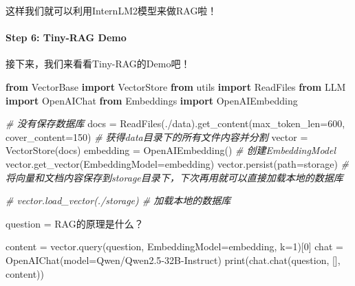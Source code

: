 \documentclass[
]{article}
\newenvironment{Shaded}{}{}
\newcommand{\BuiltInTok}[1]{\textcolor[rgb]{0.00,0.50,0.00}{#1}}
\newcommand{\CommentTok}[1]{\textcolor[rgb]{0.38,0.63,0.69}{\textit{#1}}}
\newcommand{\DecValTok}[1]{\textcolor[rgb]{0.25,0.63,0.44}{#1}}
\newcommand{\ImportTok}[1]{\textcolor[rgb]{0.00,0.50,0.00}{\textbf{#1}}}
\newcommand{\NormalTok}[1]{#1}
\newcommand{\OperatorTok}[1]{\textcolor[rgb]{0.40,0.40,0.40}{#1}}
\newcommand{\StringTok}[1]{\textcolor[rgb]{0.25,0.44,0.63}{#1}}
\begin{document}
这样我们就可以利用InternLM2模型来做RAG啦！

\paragraph{Step 6: Tiny-RAG Demo}\label{step-6-tiny-rag-demo}

接下来，我们来看看Tiny-RAG的Demo吧！

\begin{Shaded}
\begin{Highlighting}[]
\ImportTok{from}\NormalTok{ VectorBase }\ImportTok{import}\NormalTok{ VectorStore}
\ImportTok{from}\NormalTok{ utils }\ImportTok{import}\NormalTok{ ReadFiles}
\ImportTok{from}\NormalTok{ LLM }\ImportTok{import}\NormalTok{ OpenAIChat}
\ImportTok{from}\NormalTok{ Embeddings }\ImportTok{import}\NormalTok{ OpenAIEmbedding}

\CommentTok{\# 没有保存数据库}
\NormalTok{docs }\OperatorTok{=}\NormalTok{ ReadFiles(}\StringTok{\textquotesingle{}./data\textquotesingle{}}\NormalTok{).get\_content(max\_token\_len}\OperatorTok{=}\DecValTok{600}\NormalTok{, cover\_content}\OperatorTok{=}\DecValTok{150}\NormalTok{) }\CommentTok{\# 获得data目录下的所有文件内容并分割}
\NormalTok{vector }\OperatorTok{=}\NormalTok{ VectorStore(docs)}
\NormalTok{embedding }\OperatorTok{=}\NormalTok{ OpenAIEmbedding() }\CommentTok{\# 创建EmbeddingModel}
\NormalTok{vector.get\_vector(EmbeddingModel}\OperatorTok{=}\NormalTok{embedding)}
\NormalTok{vector.persist(path}\OperatorTok{=}\StringTok{\textquotesingle{}storage\textquotesingle{}}\NormalTok{) }\CommentTok{\# 将向量和文档内容保存到storage目录下，下次再用就可以直接加载本地的数据库}

\CommentTok{\# vector.load\_vector(\textquotesingle{}./storage\textquotesingle{}) \# 加载本地的数据库}

\NormalTok{question }\OperatorTok{=} \StringTok{\textquotesingle{}RAG的原理是什么？\textquotesingle{}}

\NormalTok{content }\OperatorTok{=}\NormalTok{ vector.query(question, EmbeddingModel}\OperatorTok{=}\NormalTok{embedding, k}\OperatorTok{=}\DecValTok{1}\NormalTok{)[}\DecValTok{0}\NormalTok{]}
\NormalTok{chat }\OperatorTok{=}\NormalTok{ OpenAIChat(model}\OperatorTok{=}\StringTok{\textquotesingle{}Qwen/Qwen2.5{-}32B{-}Instruct\textquotesingle{}}\NormalTok{)}
\BuiltInTok{print}\NormalTok{(chat.chat(question, [], content))}
\end{Highlighting}
\end{Shaded}
\end{document}
